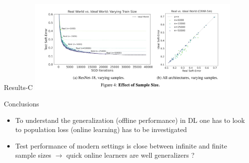 \documentclass[aspectratio=169]{beamer}
\begin{document}
\begin{frame}{Results-C}
	\centering
	\includegraphics[width=0.8\textwidth]{Figures/4}
\end{frame}

\begin{frame}{Conclusions}
\begin{itemize}
	\item To understand the generalization (offline performance) in DL one has to look to population loss (online learning) has to be investigated
	\item Test performance of modern settings is close between infinite and finite sample sizes $\to$ quick online learners are well generalizers ?
\end{itemize}	
\end{frame}
\end{document}
